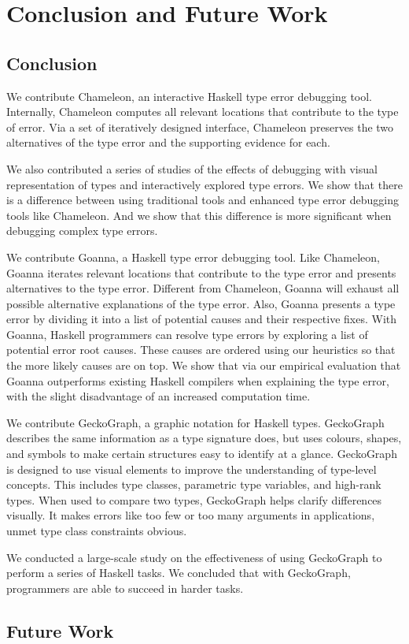 


\chapter{Conclusion and Future Work}

\label{chap:conclustion} 

\section{Conclusion}

We contribute Chameleon, an interactive Haskell type error debugging tool. Internally, Chameleon computes all relevant locations that contribute to the type of error. Via a set of iteratively designed interface, Chameleon preserves the two alternatives of the type error and the supporting evidence for each.


We also contributed a series of studies of the effects of debugging with visual representation of types and interactively explored type errors. We show that there is a difference between using traditional tools and enhanced type error debugging tools like Chameleon. And we show that this difference is more significant when debugging complex type errors.

 

We contribute Goanna, a Haskell type error debugging tool. Like Chameleon, Goanna iterates relevant locations that contribute to the type error and presents alternatives to the type error. Different from Chameleon, Goanna will exhaust all possible alternative explanations of the type error. Also, Goanna presents a type error by dividing it into a list of potential causes and their respective fixes. With Goanna, Haskell programmers can resolve type errors by exploring a list of potential error root causes. These causes are ordered using our heuristics so that the more likely causes are on top. We show that via our empirical evaluation that Goanna outperforms existing Haskell compilers when explaining the type error, with the slight disadvantage of an increased computation time.


We contribute GeckoGraph, a graphic notation for Haskell types. GeckoGraph describes the same information as a type signature does, but uses colours, shapes, and symbols to make certain structures easy to identify at a glance. GeckoGraph is designed to use visual elements to improve the understanding of type-level concepts. This includes type classes, parametric type variables, and high-rank types. When used to compare two types, GeckoGraph helps clarify differences visually. It makes errors like too few or too many arguments in applications, unmet type class constraints obvious.


We conducted a large-scale study on the effectiveness of using GeckoGraph to perform a series of Haskell tasks. We concluded that with GeckoGraph, programmers are able to succeed in harder tasks.

\section{Future Work}

